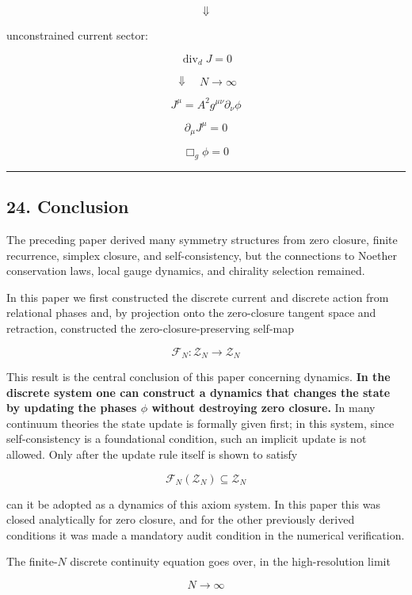 \documentclass[
  a4paper,
]{article}
\begin{document}
\[
\Downarrow
\]

unconstrained current sector:

\[
\boxed{
\operatorname{div}_dJ=0
}
\]

\[
\Downarrow
\quad
N\to\infty
\]

\[
\boxed{
J^\mu
=
A^2g^{\mu\nu}\partial_\nu\phi
}
\]

\[
\boxed{
\partial_\mu J^\mu=0
}
\]

\[
\boxed{
\Box_g\phi=0
}
\]

\begin{center}\rule{0.5\linewidth}{0.5pt}\end{center}

\subsection{24. Conclusion}\label{conclusion}

The preceding paper derived many symmetry structures from zero closure,
finite recurrence, simplex closure, and self-consistency, but the
connections to Noether conservation laws, local gauge dynamics, and
chirality selection remained.

In this paper we first constructed the discrete current and discrete
action from relational phases and, by projection onto the zero-closure
tangent space and retraction, constructed the zero-closure-preserving
self-map

\[
\mathcal F_N:
\mathcal Z_N\to\mathcal Z_N
\]

This result is the central conclusion of this paper concerning dynamics.
\textbf{In the discrete system one can construct a dynamics that changes
the state by updating the phases \(\phi\) without destroying zero
closure.} In many continuum theories the state update is formally given
first; in this system, since self-consistency is a foundational
condition, such an implicit update is not allowed. Only after the update
rule itself is shown to satisfy

\[
\boxed{
\mathcal F_N(\mathcal Z_N)\subseteq\mathcal Z_N
}
\]

can it be adopted as a dynamics of this axiom system. In this paper this
was closed analytically for zero closure, and for the other previously
derived conditions it was made a mandatory audit condition in the
numerical verification.

The finite-\(N\) discrete continuity equation goes over, in the
high-resolution limit

\[
N\to\infty
\]
\end{document}
